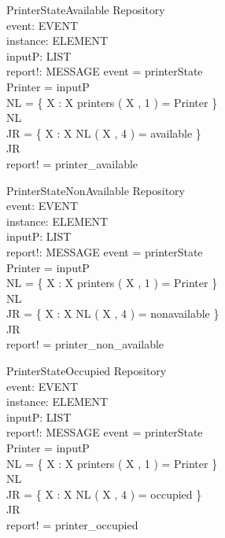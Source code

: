 \begin{schema}{PrinterStateAvailable}
\Delta Repository \\
event: EVENT \\
instance: ELEMENT \\
inputP: LIST \\
report!: MESSAGE
\where event = printerState \\
Printer = \head inputP \\
NL = \{ X : \nat \bbar X \mem printers \land \nth( X , 1 ) = Printer \} \\
NL \neq \emptyset \\
JR = \{ X : \nat \bbar X \mem NL \land \nth( X , 4 ) = available \} \\
JR \neq \emptyset \\
report! = printer\_available
\end{schema}

\begin{schema}{PrinterStateNonAvailable}
\Delta Repository \\
event: EVENT \\
instance: ELEMENT \\
inputP: LIST \\
report!: MESSAGE
\where event = printerState \\
Printer = \head inputP \\
NL = \{ X : \nat \bbar X \mem printers \land \nth( X , 1 ) = Printer \} \\
NL \neq \emptyset \\
JR = \{ X : \nat \bbar X \mem NL \land \nth( X , 4 ) = nonavailable \} \\
JR \neq \emptyset \\
report! = printer\_non\_available
\end{schema}

\begin{schema}{PrinterStateOccupied}
\Delta Repository \\
event: EVENT \\
instance: ELEMENT \\
inputP: LIST \\
report!: MESSAGE
\where event = printerState \\
Printer = \head inputP \\
NL = \{ X : \nat \bbar X \mem printers \land \nth( X , 1 ) = Printer \} \\
NL \neq \emptyset \\
JR = \{ X : \nat \bbar X \mem NL \land \nth( X , 4 ) = occupied \} \\
JR \neq \emptyset \\
report! = printer\_occupied
\end{schema}


